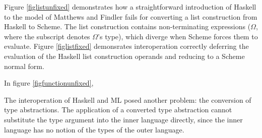 Figure \ref{figlistunfixed} demonstrates how a straightforward introduction of Haskell to the model of Matthews and Findler fails for converting a list construction from Haskell to Scheme. The list construction contains non-terminating expressions ($\Omega$, where the subscript denotes $\Omega$'s type), which diverge when Scheme forces them to evaluate. Figure \ref{figlistfixed} demonsrates interoperation correctly deferring the evaluation of the Haskell list construction operands and reducing to a Scheme normal form.

In figure \ref{figfunctionunfixed}, 









The interoperation of Haskell and ML posed another problem: the conversion of type abstractions. The application of a converted type abstraction cannot substitute the type argument into the inner language directly, since the inner language has no notion of the types of the outer language.